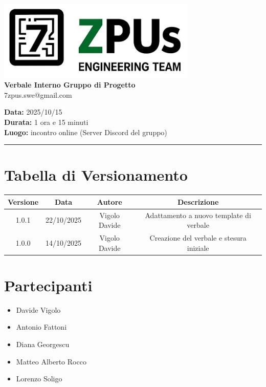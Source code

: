 \documentclass[a4paper,12pt]{article}
\begin{document}
\begin{center}
    \includegraphics[width=9.5cm]{../../../assets/logo7zpus.jpg}\\
    \Large \textbf{Verbale Interno Gruppo di Progetto}\\
    \vspace{0.5cm}
    \small\hspace{10cm} 7zpus.swe@gmail.com
\end{center}

\noindent
\textbf{Data:} 2025/10/15 \\
\textbf{Durata:} 1 ora e 15 minuti \\
\textbf{Luogo:} incontro online (Server Discord del gruppo)

\vspace{0.3cm}
\hrule
\vspace{0.5cm}

\tableofcontents

\newpage

\section{Tabella di Versionamento}
    \begin{tabular}{|c|c|c|c|}
        \hline
        \textbf{Versione} & \textbf{Data} & \textbf{Autore} & \textbf{Descrizione} \\
        \hline
        1.0.1 & 22/10/2025 & Vigolo Davide & Adattamento a nuovo template di verbale \\
        1.0.0 & 14/10/2025 & Vigolo Davide & Creazione del verbale e stesura iniziale \\
        \hline
    \end{tabular}


\section{Partecipanti}
\begin{itemize}[noitemsep]
    \item Davide Vigolo
    \item Antonio Fattoni
    \item Diana Georgescu
    \item Matteo Alberto Rocco
    \item Lorenzo Soligo
\end{itemize}
\end{document}
